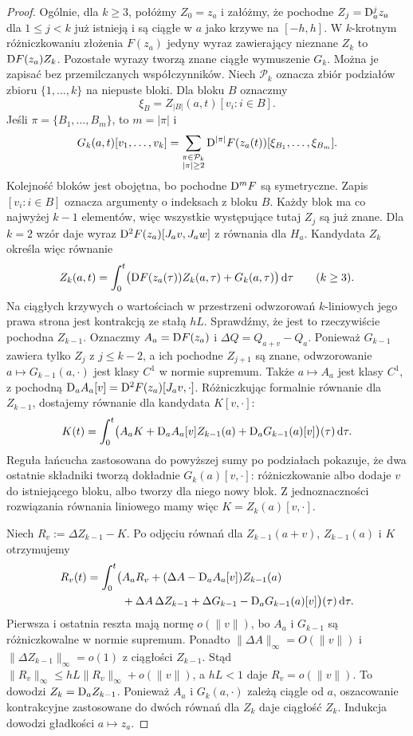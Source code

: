 \begin{proof}
Ogólnie, dla $k\ge3$, połóżmy $Z_0=z_a$ i załóżmy,
że pochodne $Z_j=\mathrm D_a^j z_a$ dla $1\le j<k$
już istnieją i są ciągłe w $a$ jako krzywe na $[-h,h]$.
W $k$-krotnym różniczkowaniu złożenia $F(z_a)$ jedyny wyraz
zawierający nieznane $Z_k$ to $\mathrm D F(z_a)Z_k$.
Pozostałe wyrazy tworzą znane ciągłe wymuszenie $G_k$.
Można je zapisać bez przemilczanych współczynników.
Niech $\mathcal P_k$ oznacza zbiór podziałów zbioru
$\{1,\ldots,k\}$ na niepuste bloki. Dla bloku $B$ oznaczmy
\[
 \xi_B=Z_{|B|}(a,t)[v_i:i\in B].
\]
Jeśli $\pi=\{B_1,\ldots,B_m\}$, to $m=|\pi|$ i
\[
G_k(a,t)[v_1,\ldots,v_k]
=\sum_{\substack{\pi\in\mathcal P_k\\|\pi|\ge2}}
 \mathrm D^{|\pi|}F(z_a(t))
 [\xi_{B_1},\ldots,\xi_{B_m}].
\]
Kolejność bloków jest obojętna, bo pochodne $\mathrm D^mF$ są symetryczne.
Zapis $[v_i:i\in B]$ oznacza argumenty o indeksach z bloku $B$.
Każdy blok ma co najwyżej $k-1$ elementów, więc wszystkie
występujące tutaj $Z_j$ są już znane. Dla $k=2$ wzór daje
wyraz $\mathrm D^2F(z_a)[J_av,J_aw]$ z równania dla $H_a$.
Kandydata $Z_k$ określa więc równanie
\[
 Z_k(a,t)=\int_0^t\bigl(\mathrm D F(z_a(\tau))Z_k(a,\tau)
                         +G_k(a,\tau)\bigr)\,\mathrm d\tau
 \qquad(k\ge3).
\]
Na ciągłych krzywych o wartościach w przestrzeni odwzorowań
$k$-liniowych jego prawa strona jest kontrakcją ze stałą $hL$.
Sprawdźmy, że jest to rzeczywiście pochodna $Z_{k-1}$.
Oznaczmy $A_a=\mathrm D F(z_a)$ i $\Delta Q=Q_{a+v}-Q_a$.
Ponieważ $G_{k-1}$ zawiera tylko $Z_j$ z $j\le k-2$,
a ich pochodne $Z_{j+1}$ są znane, odwzorowanie
$a\mapsto G_{k-1}(a,\cdot)$ jest klasy $C^1$ w normie supremum.
Także $a\mapsto A_a$ jest klasy $C^1$, z pochodną
$\mathrm D_aA_a[v]=\mathrm D^2F(z_a)[J_av,\cdot]$.
Różniczkując formalnie równanie dla $Z_{k-1}$, dostajemy
równanie dla kandydata $K[v,\cdot]$:
\[
K(t)=\int_0^t\bigl(A_aK
 +\mathrm D_aA_a[v]Z_{k-1}(a)
 +\mathrm D_aG_{k-1}(a)[v]\bigr)(\tau)\,\mathrm d\tau.
\]
Reguła łańcucha zastosowana do powyższej sumy po podziałach
pokazuje, że dwa ostatnie składniki tworzą dokładnie
$G_k(a)[v,\cdot]$: różniczkowanie albo dodaje $v$ do
istniejącego bloku, albo tworzy dla niego nowy blok.
Z jednoznaczności rozwiązania równania liniowego mamy więc
$K=Z_k(a)[v,\cdot]$.

Niech $R_v:=\Delta Z_{k-1}-K$.
Po odjęciu równań dla $Z_{k-1}(a+v)$, $Z_{k-1}(a)$ i $K$
otrzymujemy
\begin{align*}
R_v(t)=\int_0^t\bigl(&A_aR_v
 +(\Delta A-\mathrm D_aA_a[v])Z_{k-1}(a)\\
 &+\Delta A\,\Delta Z_{k-1}
 +\Delta G_{k-1}-\mathrm D_aG_{k-1}(a)[v]\bigr)(\tau)\,\mathrm d\tau.
\end{align*}
Pierwsza i ostatnia reszta mają normę $o(\|v\|)$,
bo $A_a$ i $G_{k-1}$ są różniczkowalne w normie supremum.
Ponadto $\|\Delta A\|_\infty=O(\|v\|)$ i
$\|\Delta Z_{k-1}\|_\infty=o(1)$ z ciągłości $Z_{k-1}$.
Stąd $\|R_v\|_\infty\leq hL\|R_v\|_\infty+o(\|v\|)$,
a $hL<1$ daje $R_v=o(\|v\|)$.
To dowodzi $Z_k=\mathrm D_aZ_{k-1}$.
Ponieważ $A_a$ i $G_k(a,\cdot)$ zależą ciągle od $a$,
oszacowanie kontrakcyjne zastosowane do dwóch równań dla $Z_k$
daje ciągłość $Z_k$. Indukcja dowodzi gładkości $a\mapsto z_a$.


\end{proof}
